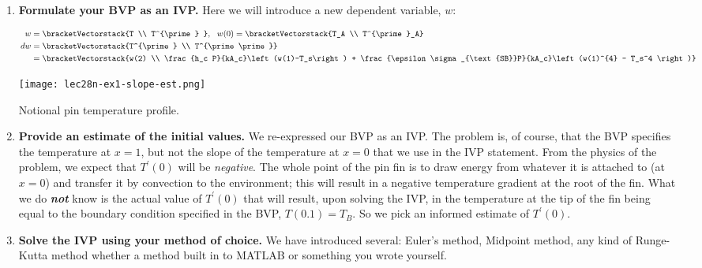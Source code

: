 \begin{enumerate}
\item \textbf{Formulate your BVP as an IVP.}  Here we will introduce a new dependent variable, $w$:

\begin{align*}
w &= \bracketVectorstack{T \\ T^{\prime} }, \ \ w(0) = \bracketVectorstack{T_A \\ T^{\prime}_A} \\
dw &= \bracketVectorstack{T^{\prime} \\ T^{\prime \prime}} \\
 &= \bracketVectorstack{w(2) \\ \frac{h_c P}{kA_c}\left(w(1)-T_s\right) + \frac{\epsilon \sigma_{\text{SB}}P}{kA_c}\left(w(1)^{4} - T_s^4 \right)}
\end{align*}

\begin{marginfigure}
\texttt{[image: lec28n-ex1-slope-est.png]}
\caption{Notional pin temperature profile.}
\label{fig:lec28n-ex1-slope-est}
\end{marginfigure}

\item \textbf{Provide an estimate of the initial values.} We re-expressed our BVP as an IVP.  The problem is, of course, that the BVP specifies the temperature at $x=1$, but not the slope of the temperature at $x=0$ that we use in the IVP statement.  From the physics of the problem, we expect that $T^{\prime}(0)$ will be \emph{negative}.  The whole point of the pin fin is to draw energy from whatever it is attached to (at $x=0$) and transfer it by convection to the environment; this will result in a negative temperature gradient at the root of the fin.  What we do \emph{\textbf{not}} know is the actual value of $T^{\prime}(0)$ that will result, upon solving the IVP, in the temperature at the tip of the fin being equal to the boundary condition specified in the BVP, $T(0.1)=T_B$.  So we pick an informed estimate of $T^{\prime}(0)$.

\item \textbf{Solve the IVP using your method of choice.}  We have introduced several: Euler's method, Midpoint method, any kind of Runge-Kutta method whether a method built in to MATLAB or something you wrote yourself.


\end{enumerate}
